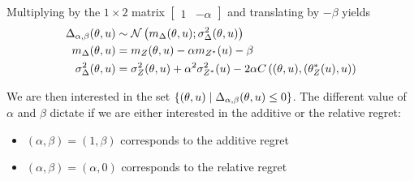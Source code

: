 \documentclass[../../Main_ManuscritThese.tex]{subfiles}
\begin{document}
Multiplying by the $1\times 2$ matrix
$\begin{bmatrix}1                & -\alpha \end{bmatrix}$ and translating by $-\beta$
yields
\begin{align}
  \Delta_{\alpha,\beta}(\theta,u) & \sim \mathcal{N}\left(m_{\Delta}(\theta,u); \sigma^2_{\Delta}(\theta,u)\right)  \label{eq:delta_GP_ab} \\
  m_{\Delta}(\theta,u)            & = m_Z(\theta,u) - \alpha m_{{Z^*}}(u) - \beta \label{eq:mu_delta_GP_ab}                             \\
  \sigma^2_{\Delta}(\theta,u)     & = \sigma_Z^2(\theta,u) + \alpha^2 \sigma_{Z^*}^2(u) - 2\alpha C\left((\theta,u),(\theta^*_Z(u),u)\right) \label{eq:variance_delta_GP_ab}
\end{align}

We are then interested in the set
$\{(\theta, u) \mid \Delta_{\alpha, \beta}(\theta, u) \leq 0\}$. The
different value of $\alpha$ and $\beta$ dictate if we are either
interested in the additive or the relative regret:
\begin{itemize}
\item $(\alpha, \beta) = (1, \beta)$ corresponds to the additive regret
\item $(\alpha, \beta) = (\alpha, 0)$ corresponds to the relative regret
\end{itemize}

\end{document}
